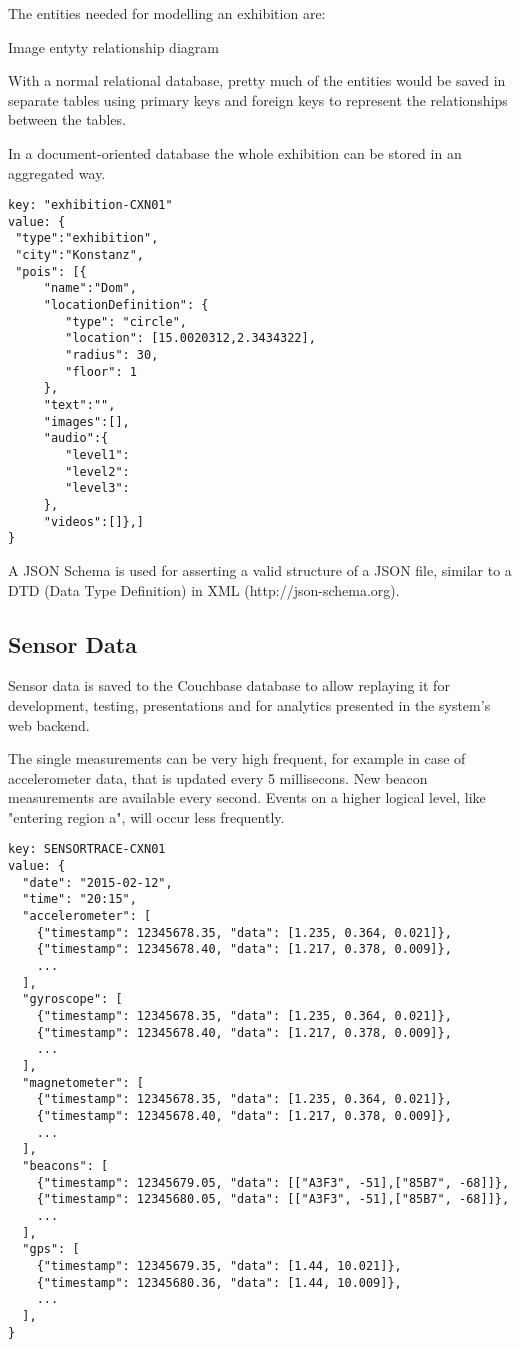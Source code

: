 The entities needed for modelling an exhibition are:

Image entyty relationship diagram

With a normal relational database, pretty much of the entities would be saved in separate tables using primary keys and foreign keys to represent the relationships between the tables.

In a document-oriented database the whole exhibition can be stored in an aggregated way. 

\begin{lstlisting}
key: "exhibition-CXN01"
value: {
 "type":"exhibition",
 "city":"Konstanz",
 "pois": [{
	 "name":"Dom", 
	 "locationDefinition": {
	 	"type": "circle",
	 	"location": [15.0020312,2.3434322],
	 	"radius": 30,
	 	"floor": 1
	 }, 
	 "text":"", 
	 "images":[], 
	 "audio":{
	 	"level1":
	 	"level2":
	 	"level3":
	 }, 
	 "videos":[]},]
}
\end{lstlisting}

A JSON Schema is used for asserting a valid structure of a JSON file, similar to a DTD (Data Type Definition) in XML (http://json-schema.org).

\subsection{Sensor Data}

Sensor data is saved to the Couchbase database to allow replaying it for development, testing, presentations and for analytics presented in the system's web backend. 

The single measurements can be very high frequent, for example in case of accelerometer data, that is updated every 5 millisecons. New beacon measurements are available every second. Events on a higher logical level, like "entering region a", will occur less frequently.

\begin{lstlisting}[basicstyle=\footnotesize]
key: SENSORTRACE-CXN01
value: {
  "date": "2015-02-12",
  "time": "20:15",
  "accelerometer": [
    {"timestamp": 12345678.35, "data": [1.235, 0.364, 0.021]},
    {"timestamp": 12345678.40, "data": [1.217, 0.378, 0.009]},
    ...
  ],
  "gyroscope": [
    {"timestamp": 12345678.35, "data": [1.235, 0.364, 0.021]},
    {"timestamp": 12345678.40, "data": [1.217, 0.378, 0.009]},
    ...
  ],
  "magnetometer": [
    {"timestamp": 12345678.35, "data": [1.235, 0.364, 0.021]},
    {"timestamp": 12345678.40, "data": [1.217, 0.378, 0.009]},
    ...
  ],
  "beacons": [
    {"timestamp": 12345679.05, "data": [["A3F3", -51],["85B7", -68]]},
    {"timestamp": 12345680.05, "data": [["A3F3", -51],["85B7", -68]]},
    ...
  ],
  "gps": [
    {"timestamp": 12345679.35, "data": [1.44, 10.021]},
    {"timestamp": 12345680.36, "data": [1.44, 10.009]},
    ...
  ],
}
\end{lstlisting}


